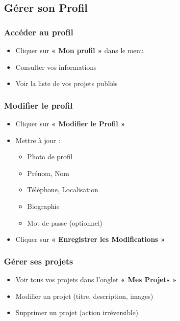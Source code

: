 \documentclass[12pt,a4paper]{article}
\begin{document}
\subsection{Gérer son Profil}

\subsubsection{Accéder au profil}
\begin{itemize}[leftmargin=*]
    \item Cliquer sur \textbf{« Mon profil »} dans le menu
    \item Consulter vos informations
    \item Voir la liste de vos projets publiés
\end{itemize}

\subsubsection{Modifier le profil}
\begin{itemize}[leftmargin=*]
    \item Cliquer sur \textbf{« Modifier le Profil »}
    \item Mettre à jour :
    \begin{itemize}
        \item Photo de profil
        \item Prénom, Nom
        \item Téléphone, Localisation
        \item Biographie
        \item Mot de passe (optionnel)
    \end{itemize}
    \item Cliquer sur \textbf{« Enregistrer les Modifications »}
\end{itemize}

\subsubsection{Gérer ses projets}
\begin{itemize}[leftmargin=*]
    \item Voir tous vos projets dans l'onglet \textbf{« Mes Projets »}
    \item Modifier un projet (titre, description, images)
    \item Supprimer un projet (action irréversible)
\end{itemize}
\end{document}
